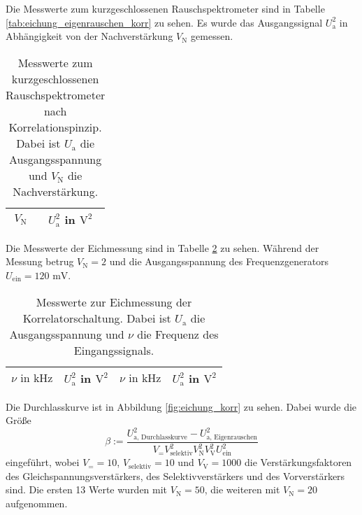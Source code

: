 		Die Messwerte zum kurzgeschlossenen Rauschspektrometer sind 
		in Tabelle \ref{tab:eichung_eigenrauschen_korr} zu sehen. 
		Es wurde das Ausgangssignal $U^2_\text{a}$ in Abhängigkeit von 
		der Nachverstärkung $V_\text{N}$ gemessen.
		
		\begin{table}[h]
		\centering
			\begin{tabular}{cc}
				\toprule \midrule
				$V_\text{N}$ & $U^2_\text{a}$ in $\text{V}^2$
				\\
				\midrule
				
				\midrule \bottomrule
			\end{tabular}
			\caption{Messwerte zum kurzgeschlossenen  
			Rauschspektrometer nach Korrelationspinzip. Dabei ist $U_\text{a}$ die 
			Ausgangsspannung und $V_\text{N}$ die Nachverstärkung.}
			\label{tab:eichung_eigenrauschen_einfach}
		\end{table}
		
		Die Messwerte der Eichmessung sind in Tabelle 
		\ref{tab:eichung_korr} zu sehen. Während der Messung 
		betrug $V_\text{N}=2$ und die Ausgangsspannung des 
		Frequenzgenerators $U_\text{ein} = 120 \text{ mV}$.
		
		\begin{table}[h]
		\centering
			\begin{tabular}{cccc}
				\toprule \midrule
				$\nu \text{ in} \text{ kHz}$ & $U^2_\text{a}$ in $\text{V}^2$ &
				$\nu \text{ in} \text{ kHz}$ & $U^2_\text{a}$ in $\text{V}^2$ 
				\\
				\midrule
				
				\midrule \bottomrule
			\end{tabular}
			\caption{Messwerte zur Eichmessung der Korrelatorschaltung. Dabei ist $U_\text{a}$ 
			die 
			Ausgangsspannung und $\nu$ die Frequenz des 
			Eingangssignals. }
			\label{tab:eichung_korr}
		\end{table}
		
		Die Durchlasskurve ist in Abbildung \ref{fig:eichung_korr} zu sehen. Dabei wurde die Größe  
		\begin{equation}
		\beta := \frac{U^2_\text{a, Durchlasskurve}-U_\text{a, Eigenrauschen}^2}
		{V_= V_\text{selektiv}^2 V_\text{N}^2 V_\text{V}^2  U^2_\text{ein}}
		\end{equation}
		eingeführt, wobei $V_= =10$, $V_\text{selektiv}=10$ und $V_\text{V}=1000$
		die Verstärkungsfaktoren des Gleichspannungsverstärkers, des Selektivverstärkers und des 
		Vorverstärkers sind. Die ersten 13 Werte wurden mit $V_\text{N}=50$, die weiteren 
		mit $V_\text{N}=20$ aufgenommen.
				

